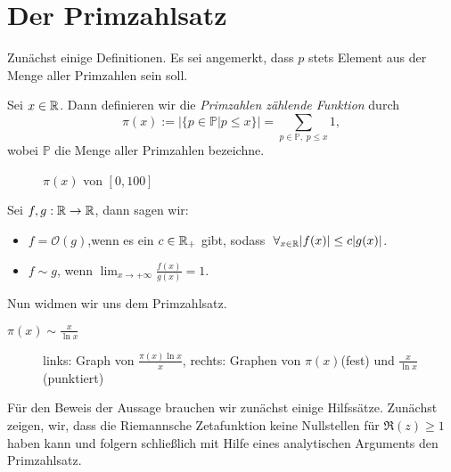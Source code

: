 \documentclass{mywork}
\begin{document}
\section*{Der Primzahlsatz}
Zunächst einige Definitionen. Es sei angemerkt, dass $ p $ stets Element aus der Menge aller Primzahlen sein soll.

\begin{df}
Sei $ x\in \mathbb{R} $. Dann definieren wir die \emph{Primzahlen zählende Funktion} durch
\[
\pi(x):=\Big|\{p\in \mathbb P| p \le x\}\Big|=\sum_{p \in \mathbb P,\; p \le x} 1,
\]
wobei $ \mathbb P $ die Menge aller Primzahlen bezeichne.
\end{df} 
\begin{figure}[H]
	\centering
	\newlength\figureheight 
	\newlength\figurewidth 
	\setlength\figureheight{6cm} 
	\setlength\figurewidth{10cm}
	
	\caption{$ \pi(x) $ von $ [0,100] $}
	\label{fig:pi}
\end{figure}

\begin{df}
Sei $ f,g: \mathbb{R}\to \mathbb{R} $, dann sagen wir:
\begin{itemize}
\item $ f=\mathcal O(g)$,wenn es ein $ c\in \mathbb{R}_+ $ gibt, sodass $ \forall_{x\in \R} |f(x)|\le c|g(x)| $.
\item $ f\sim g $, wenn $ \lim_{x\to +\infty} \frac{f(x)}{g(x)}=1 $.
\end{itemize}
\end{df}

Nun widmen wir uns dem Primzahlsatz.
\begin{st}[Primzahlsatz]
$ \pi(x)\sim \frac{x}{\ln x} $
\end{st}
\begin{figure}[H]
	\centering
	\setlength\figureheight{3cm} 
	\setlength\figurewidth{5cm}
	\begin{minipage}{5cm}\end{minipage} \hspace{3cm} \begin{minipage}{5cm} \end{minipage}
	\caption{links: Graph von $\frac{\pi(x) \ln x}x$, rechts: Graphen von $ \pi(x) $(fest) und $ \frac{x}{\ln x} $(punktiert)}
	\label{fig:quotient}
\end{figure}

Für den Beweis der Aussage brauchen wir zunächst einige Hilfssätze. Zunächst zeigen, wir, dass die Riemannsche Zetafunktion keine Nullstellen für $ \Re(z)\ge 1 $ haben kann und folgern schließlich mit Hilfe eines analytischen Arguments den Primzahlsatz.
\end{document}
